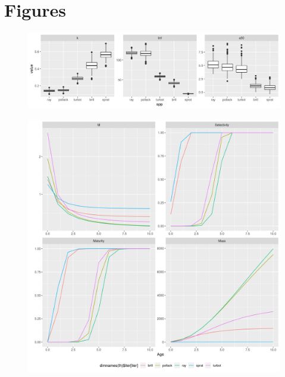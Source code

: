 \documentclass[preprint,12pt]{elsarticle}
\begin{document}

 

\section{Figures}

\begin{figure}[]\centering\includegraphics[width=5in]{rg-lhpar-1.png}\caption{}\label{fig:lh}\end{figure}
\begin{figure}[]\centering\includegraphics[width=5in]{rg-vectors-1.png}\caption{}\label{fig:vector}\end{figure}
\end{document}

